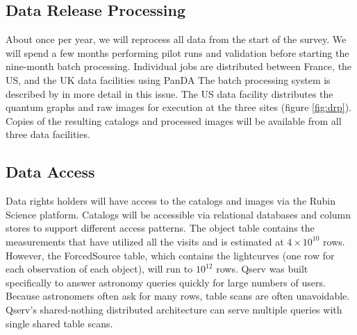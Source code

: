 \documentclass[11pt,twoside]{article}
\begin{document}
\begin{centering}
\end{centering}

\subsection{Data Release Processing}\label{sec:DRP}
About once per year, we will reprocess all data from the start of the survey.
We will spend a few months performing pilot runs and validation before starting the nine-month batch processing.
Individual jobs are distributed between France, the US, and the UK data facilities using PanDA \citep{DMTN-213}
The batch processing system is described by \citet{P52_adassxxxii} in more detail in this issue.
The US data facility distributes the quantum graphs and raw images for execution at the three sites (figure \ref{fig:drp}).
Copies of the resulting catalogs and processed images will be available from all three data facilities.

\begin{centering}
\end{centering}


\subsection{Data Access} \label{sec:dataaccess}

Data rights holders will have access to the catalogs and images via the Rubin Science platform.
Catalogs will be accessible via relational databases and column stores to support different access patterns.
The object table contains the measurements that have utilized all the visits and is estimated at $4 \times 10^{10}$ rows.
However, the ForcedSource table, which contains the lightcurves (one row for each observation of each object), will run to $10^{12}$ rows.
Qserv \citep{C15_adassxxxii} was built specifically to answer astronomy queries quickly for large numbers of users.
Because astronomers often ask for many rows, table scans are often unavoidable.
Qserv's shared-nothing distributed architecture can serve multiple queries with single shared table scans.
\end{document}
